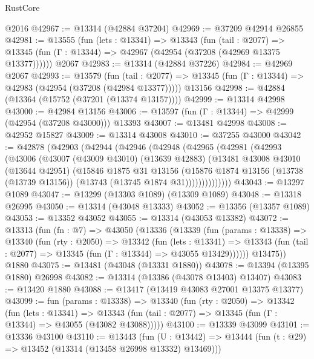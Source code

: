 \begin{lexlean}{RustCore}
\begin{coremodule}
    @2016
@42967 := @13314 (@42884 @37204)
@42969 := @37209 @42914 @26855
@42981 := @13555
    (fun (lets : @13341) =>
    @13343
      (fun (tail : @2077) =>
      @13345 (fun (Γ : @13344) => @42967 (@42954 (@37208 (@42969 @13375 @13377))))))
    @2067
@42983 := @13314 (@42884 @37226)
@42984 := @42969 @2067
@42993 := @13579
    (fun (tail : @2077) => @13345 (fun (Γ : @13344) => @42983 (@42954 (@37208 (@42984 @13377)))))
    @13156
@42998 := @42884 (@13364 (@15752 (@37201 (@13374 @13157))))
@42999 := @13314 @42998
@43000 := @42984 @13156
@43006 := @13597 (fun (Γ : @13344) => @42999 (@42954 (@37208 @43000))) @13393
@43007 := @13481 @42998
@43008 := @42952 @15827
@43009 := @13314 @43008
@43010 := @37255 @43000
@43042 := @42878
    (@42903
      (@42944
        (@42946
          (@42948
            (@42965
              (@42981
                (@42993
                  (@43006
                    (@43007
                      (@43009 @43010)
                      (@13639 @42883)
                      (@13481
                        @43008
                        @43010
                        (@13644 @42951)
                        (@15846
                          @1875
                          @31
                          @13156
                          (@15876
                            @1874
                            @13156
                            (@13738 (@13739 @13156))
                            (@13743 (@13745 @1874 @31))))))))))))))
@43043 := @13297 @1089
@43047 := @13299 (@13303 @1089) (@13309 @1089)
@43048 := @13318 @26995
@43050 := @13314 (@43048 @13333)
@43052 := @13356 (@13357 @1089)
@43053 := @13352 @43052
@43055 := @13314 (@43053 @13382)
@43072 := @13313
    (fun (fn : @7) =>
    @43050
      (@13336
        (@13339
          (fun (params : @13338) =>
          @13340
            (fun (rty : @2050) =>
            @13342
              (fun (lets : @13341) =>
              @13343 (fun (tail : @2077) => @13345 (fun (Γ : @13344) => @43055 @13429))))))
        @13475))
    @1880
@43075 := @13481 (@43048 (@13331 @1880))
@43078 := @13394 (@13395 @1880) @26998
@43082 := @13314 (@13386 (@43078 @13403) @13407)
@43083 := @13420 @1880
@43088 := @13417 (@13419 @43083 @27001 @13375 @13377)
@43099 := fun (params : @13338) =>
  @13340
    (fun (rty : @2050) =>
    @13342
      (fun (lets : @13341) =>
      @13343 (fun (tail : @2077) => @13345 (fun (Γ : @13344) => @43055 (@43082 @43088)))))
@43100 := @13339 @43099
@43101 := @13336 @43100
@43110 := @13443
    (fun (U : @13442) => @13444 (fun (t : @29) => @13452 (@13314 (@13458 @26998 @13332) @13469)))

\end{coremodule}
\end{lexlean}
